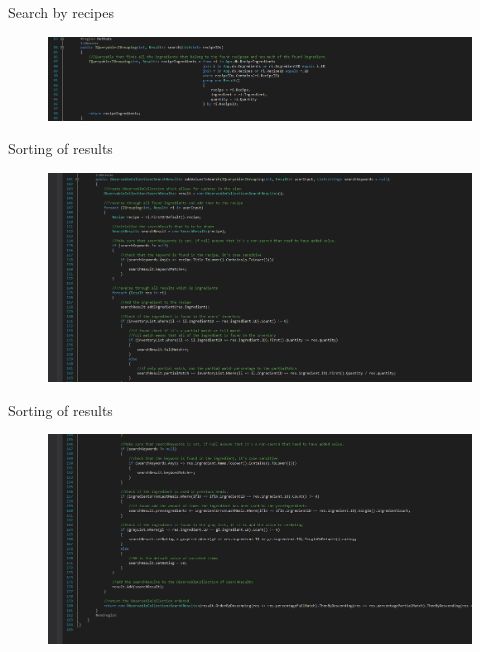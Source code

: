 \begin{frame}{Search by recipes}
    \begin{figure}
        \centering
        \includegraphics[width=\textwidth]{Grafik/search}
    \end{figure}
\end{frame}

\begin{frame}{Sorting of results}
    \begin{figure}
        \centering
        \includegraphics[width=\textwidth]{Grafik/sorter1}
    \end{figure}
\end{frame}
\begin{frame}{Sorting of results}
    \begin{figure}
        \centering
        \includegraphics[width=\textwidth]{Grafik/sorter2}
    \end{figure}
\end{frame}




















